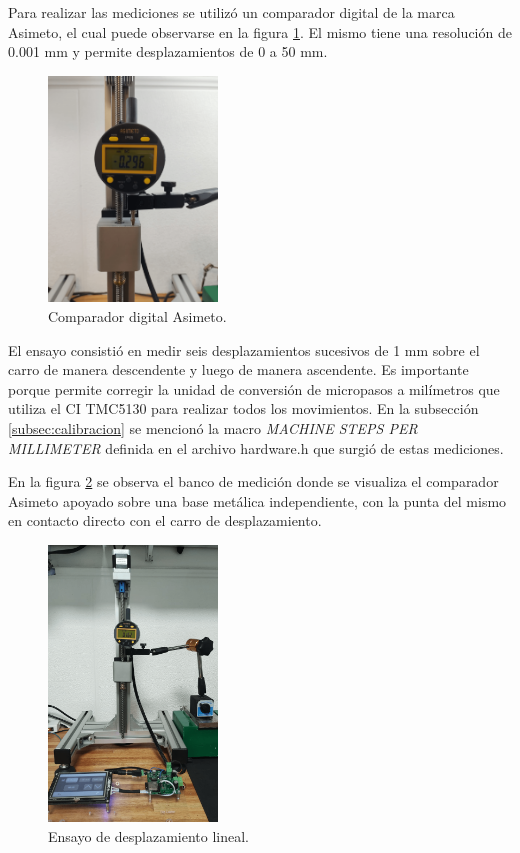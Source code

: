 Para realizar las mediciones se utilizó un comparador digital de la marca Asimeto\citep{web_asimeto}, el cual puede observarse en la figura \ref{fig:micrometro}. El mismo tiene una resolución de 0.001 mm y permite desplazamientos de 0 a 50 mm.


\begin{figure}[h!]
\centering 
\includegraphics[width=0.4\textwidth]{./Figures/micrometro.png}
\caption{Comparador digital Asimeto.}
\label{fig:micrometro}
\end{figure}

El ensayo consistió en medir seis desplazamientos sucesivos de 1 mm sobre el carro de manera descendente y luego de manera ascendente. Es importante porque permite corregir la unidad de conversión de micropasos a milímetros que utiliza el CI TMC5130 para realizar todos los movimientos. 
En la subsección \ref{subsec:calibracion} se mencionó la macro \textit{MACHINE STEPS PER MILLIMETER} definida en el archivo hardware.h que surgió de estas mediciones. 

En la figura \ref{fig:desplazamiento_lineal} se observa el banco de medición donde se visualiza el comparador Asimeto apoyado sobre una base metálica independiente, con la punta del mismo en contacto directo con el carro de desplazamiento.

\begin{figure}[h!]
\centering 
\includegraphics[width=0.4\textwidth]{./Figures/desplazamiento_lineal.png}
\caption{Ensayo de desplazamiento lineal.}
\label{fig:desplazamiento_lineal}
\end{figure}


